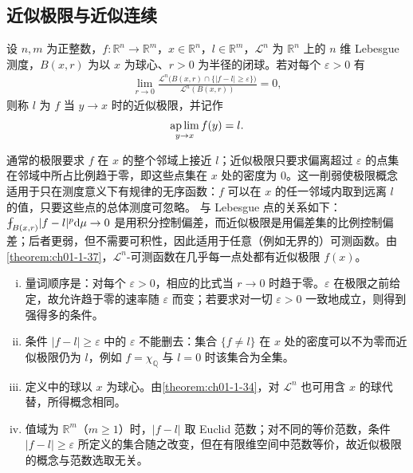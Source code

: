 \documentclass[../../main.tex]{subfiles}%
\begin{document}
\subsection{近似极限与近似连续}\label{subsection:ch01-07-2}

\begin{definition}[近似极限]\label{definition:ch01-1-27}
设 $n,m$ 为正整数，$f:\mathbb{R}^n\to\mathbb{R}^m$，$x\in\mathbb{R}^n$，$l\in\mathbb{R}^m$，$\mathcal{L}^{n}$ 为 $\mathbb{R}^n$ 上的 $n$ 维 Lebesgue 测度，$B(x,r)$ 为以 $x$ 为球心、$r>0$ 为半径的闭球。若对每个 $\varepsilon>0$ 有
\begin{align*}
\lim_{r\to0}\frac{\mathcal{L}^{n}\bigl(B(x,r)\cap\{\lvert f-l\rvert\geqslant\varepsilon\}\bigr)}{\mathcal{L}^{n}(B(x,r))}=0 ,
\end{align*}
则称 $l$ 为 $f$ 当 $y\to x$ 时的近似极限，并记作
\begin{align*}
\operatorname*{ap\,lim}_{y\to x}f(y)=l .
\end{align*}
\end{definition}

\begin{remark}\label{remark:ch01-def-1-27-动机}
通常的极限要求 $f$ 在 $x$ 的整个邻域上接近 $l$；近似极限只要求偏离超过 $\varepsilon$ 的点集在邻域中所占比例趋于零，即这些点集在 $x$ 处的密度为 $0$。这一削弱使极限概念适用于只在测度意义下有规律的无序函数：$f$ 可以在 $x$ 的任一邻域内取到远离 $l$ 的值，只要这些点的总体测度可忽略。
与 Lebesgue 点的关系如下：$\fint_{B(x,r)}\lvert f-l\rvert^{p}\diff\mu\to0$ 是用积分控制偏差，而近似极限是用偏差集的比例控制偏差；后者更弱，但不需要可积性，因此适用于任意（例如无界的）可测函数。由\cref{theorem:ch01-1-37}，$\mathcal{L}^{n}$-可测函数在几乎每一点处都有近似极限 $f(x)$。%
\end{remark}

\begin{remark}\label{remark:ch01-def-1-27-条件}
\begin{enumerate}[(i)]
\item 量词顺序是：对每个 $\varepsilon>0$，相应的比式当 $r\to0$ 时趋于零。$\varepsilon$ 在极限之前给定，故允许趋于零的速率随 $\varepsilon$ 而变；若要求对一切 $\varepsilon>0$ 一致地成立，则得到强得多的条件。
\item 条件 $\lvert f-l\rvert\geqslant\varepsilon$ 中的 $\varepsilon$ 不能删去：集合 $\{f\neq l\}$ 在 $x$ 处的密度可以不为零而近似极限仍为 $l$，例如 $f=\chi_{\mathbb{Q}}$ 与 $l=0$ 时该集合为全集。
\item 定义中的球以 $x$ 为球心。由\cref{theorem:ch01-1-34}，对 $\mathcal{L}^{n}$ 也可用含 $x$ 的球代替，所得概念相同。%
\item 值域为 $\mathbb{R}^m$（$m\geqslant1$）时，$\lvert f-l\rvert$ 取 Euclid 范数；对不同的等价范数，条件 $\lvert f-l\rvert\geqslant\varepsilon$ 所定义的集合随之改变，但在有限维空间中范数等价，故近似极限的概念与范数选取无关。
\end{enumerate}
\end{remark}
\end{document}
